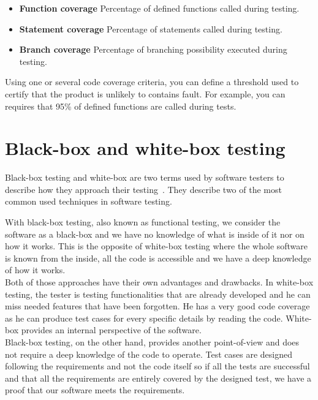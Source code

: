 \documentclass[12pt]{article}
\theoremstyle{definition}
\theoremstyle{definition}
\theoremstyle{remark}
\begin{document}
\begin{itemize}
\item \textbf{Function coverage} Percentage of defined functions called during testing.
\item \textbf{Statement coverage} Percentage of statements called during testing.
\item \textbf{Branch coverage} Percentage of branching possibility executed during testing.
\end{itemize}

Using one or several code coverage criteria, you can define a threshold used to certify that the product is unlikely to contains fault. For example, you can requires that 95\% of defined functions are called during tests.



\section{Black-box and white-box testing}


Black-box testing and white-box are two terms used by software testers to describe how they approach their testing~\cite{Patton:2005}. They describe two of the most common used techniques in software testing.

With black-box testing, also known as functional testing, we consider the software as a black-box and we have no knowledge of what is inside of it nor on how it works. This is the opposite of white-box testing where the whole software is known from the inside, all the code is accessible and we have a deep knowledge of how it works.\\

Both of those approaches have their own advantages and drawbacks. In white-box testing, the tester is testing functionalities that are already developed and he can miss needed features that have been forgotten. He has a very good code coverage as he can produce test cases for every specific details by reading the code. White-box provides an internal perspective of the software.\\

Black-box testing, on the other hand, provides another point-of-view and does not require a deep knowledge of the code to operate. Test cases are designed following the requirements and not the code itself so if all the tests are successful and that all the requirements are entirely covered by the designed test, we have a proof that our software meets the requirements.\\
\end{document}
